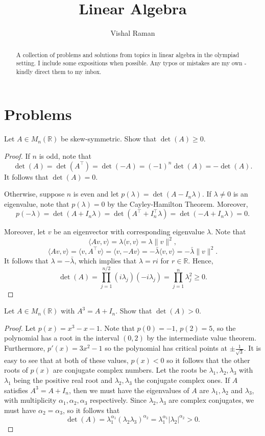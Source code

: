 \documentclass[11pt]{article}
\newcommand{\R}{\mathbb{R}}
\renewcommand{\>}{\rangle}
\newcommand{\<}{\langle}
\begin{document}
\title{Linear Algebra}
\author{Vishal Raman}
\maketitle
\begin{abstract}
A collection of problems and solutions from topics in linear algebra in the olympiad setting.  I include some expositions when possible.  Any typos or mistakes are my own - kindly direct them to my inbox.

\end{abstract}
\tableofcontents
\pagebreak
\section{Problems}
\begin{problem} Let $A \in M_n(\R)$ be skew-symmetric. Show that $\det(A) \ge 0$.
\end{problem}
\begin{proof}
If $n$ is odd, note that
 $$\det(A) = \det(A^\intercal) = \det(-A) = (-1)^n \det(A) = -\det(A).$$
 It follows that $\det(A) = 0$.

Otherwise, suppose $n$ is even and let $p(\lambda) = \det(A - I_n \lambda)$.  If $\lambda \ne 0$ is an eigenvalue, note that $p(\lambda) = 0$ by the Cayley-Hamilton Theorem.  Moreover,
$$p(-\lambda) = \det(A + I_n \lambda) = \det(A^\intercal + I_n^\intercal \lambda) = \det(-A + I_n \lambda) = 0.$$

Moreover, let $v$ be an eigenvector with corresponding eigenvalue $\lambda$.   Note that 
$$\<Av, v\> = \lambda\<v, v\> = \lambda \|v\|^2,$$
$$\<Av, v\> = \<v, A^\intercal v\> = \<v, -Av\> = -\bar{\lambda} \<v, v\> = -\bar{\lambda} \|v\|^2.$$
It follows that $\lambda = -\bar{\lambda}$, which implies that $\lambda = r i$ for $r \in \R$.  Hence,
$$\det(A) = \prod_{j=1}^{n/2} (i \lambda_j)(-i \lambda_j) = \prod_{j=1}^n \lambda_j^2 \ge 0.$$ 
\end{proof}

\begin{problem} Let $A \in M_n(\R)$ with $A^3 = A + I_n$.  Show that $\det(A) > 0$.
\end{problem}
\begin{proof}
Let $p(x) = x^3 - x - 1$.  Note that $p(0) = -1$, $p(2) = 5$, so the polynomial has a root in the interval $(0, 2)$ by the intermediate value theorem.  Furthermore, $p'(x) = 3x^2 - 1$ so the polynomial has critical points at $\pm\frac{1}{\sqrt{3}}$.  It is easy to see that at both of these values, $p(x) < 0$ so it follows that the other roots of $p(x)$ are conjugate complex numbers.  Let the roots be $\lambda_1, \lambda_2, \lambda_3$ with $\lambda_1$ being the positive real root and $\lambda_2, \lambda_3$ the conjugate complex ones.  If $A$ satisfies $A^3 = A + I_n$, then we must have the eigenvalues of $A$ are $\lambda_1, \lambda_2$ and $\lambda_3$, with multiplicity $\alpha_1, \alpha_2, \alpha_3$ respectively.  Since $\lambda_2, \lambda_3$ are complex conjugates, we must have $\alpha_2 = \alpha_3$, so it follows that 
$$\det(A) = \lambda_1^{\alpha_1} (\lambda_2 \lambda_3)^{\alpha_2} = \lambda_1^{\alpha_1} |\lambda_2|^{\alpha_2} > 0.$$
\end{proof}
\end{document}
